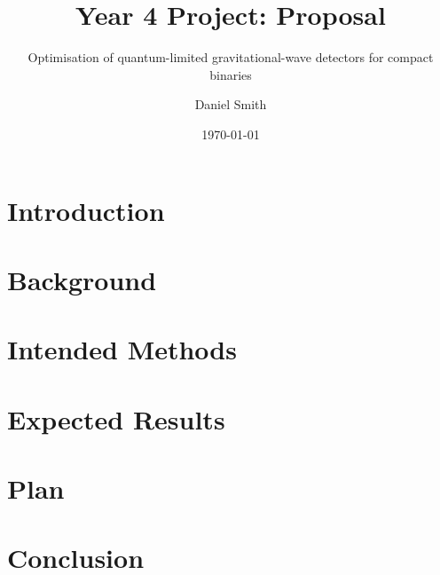 \documentclass[pdf,color]{UoB}
\title{Year 4 Project: Proposal}
\subtitle{Optimisation of quantum-limited gravitational-wave detectors for compact binaries}
\author{Daniel Smith}
\date{\today}
\begin{document}
\maketitle
\newpage
\tableofcontents
\newpage

\section{Introduction}


\section{Background}


\section{Intended Methods}


\section{Expected Results}


\section{Plan}


\section{Conclusion}




\end{document}
